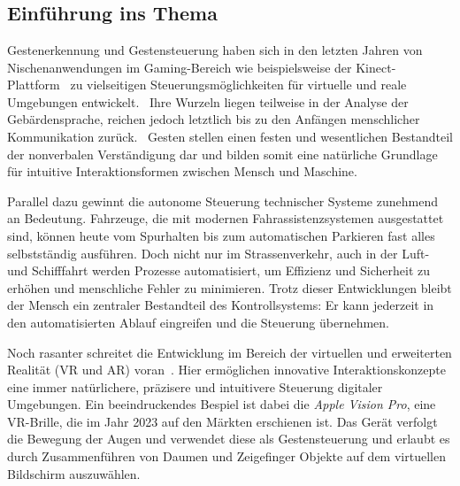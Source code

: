 \chapter{\chapOne}
\label{cha:chapter1} %

\begingroup
\fontsize{12pt}{14pt}\selectfont

\section{Einführung ins Thema}
Gestenerkennung und Gestensteuerung haben sich in den letzten Jahren von Nischenanwendungen im Gaming-Bereich wie beispielsweise der Kinect-Plattform~\cite{Wiki:Kinect} zu vielseitigen Steuerungsmöglichkeiten für virtuelle und reale Umgebungen entwickelt.~\cite{RG:GestureRecognition}
Ihre Wurzeln liegen teilweise in der Analyse der Gebärdensprache, reichen jedoch letztlich bis zu den Anfängen menschlicher Kommunikation zurück.~\cite{Wiki:Gestenerkennung}\cite{RG:Gesten}
Gesten stellen einen festen und wesentlichen Bestandteil der nonverbalen Verständigung dar und bilden somit eine natürliche Grundlage für intuitive Interaktionsformen zwischen Mensch und Maschine.~\cite[10]{Hobmair:Psy}

Parallel dazu gewinnt die autonome Steuerung technischer Systeme zunehmend an Bedeutung.
Fahrzeuge, die mit modernen Fahrassistenzsystemen ausgestattet sind, können heute vom Spurhalten bis zum automatischen Parkieren fast alles selbstständig ausführen.
Doch nicht nur im Strassenverkehr, auch in der Luft- und Schifffahrt werden Prozesse automatisiert, um Effizienz und Sicherheit zu erhöhen und menschliche Fehler zu minimieren.
Trotz dieser Entwicklungen bleibt der Mensch ein zentraler Bestandteil des Kontrollsystems: Er kann jederzeit in den automatisierten Ablauf eingreifen und die Steuerung übernehmen.~\cite{Wiki:aupi}

Noch rasanter schreitet die Entwicklung im Bereich der virtuellen und erweiterten Realität (VR und AR) voran~\cite{SD:VR}.
Hier ermöglichen innovative Interaktionskonzepte eine immer natürlichere, präzisere und intuitivere Steuerung digitaler Umgebungen.
Ein beeindruckendes Bespiel ist dabei die \textit{Apple Vision Pro}, eine VR-Brille, die im Jahr 2023 auf den Märkten erschienen ist.
Das Gerät verfolgt die Bewegung der Augen und verwendet diese als Gestensteuerung und erlaubt es durch Zusammenführen von Daumen und Zeigefinger Objekte auf dem virtuellen Bildschirm auszuwählen.~\cite{apl:vision}

